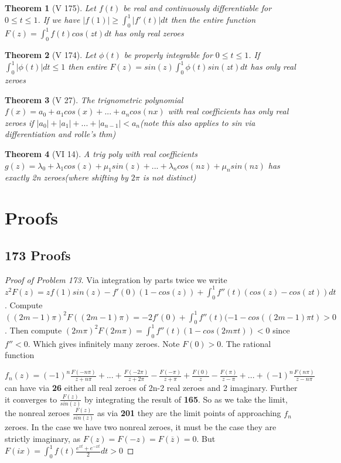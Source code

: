 \documentclass[10pt]{article}
\newcommand{\1}{\textbf{1}}
\newtheorem{theorem}{Theorem}
\theoremstyle{remark}
\theoremstyle{definition}
\begin{document}
\begin{theorem}[V 175] \label{175}
	Let $f(t)$ be real and continuously differentiable for $0 \leq t \leq 1$. If we have $|f(1)| \geq \int_0^1 |f'(t)| dt$ then the entire function $F(z) = \int_0^1 f(t)cos(zt)dt$ has only real zeroes
\end{theorem}

\begin{theorem}[V 174]
	Let $\phi(t)$ be properly integrable for $0 \leq t \leq 1$. If $\int_0^1 |\phi(t)| dt \leq 1$ then entire $F(z)=sin(z) \int_0^1 \phi(t) sin(zt)dt$ has only real zeroes
\end{theorem}

\begin{theorem}[V 27]
	The trignometric polynomial $f(x) = a_0 + a_1 cos(x) + ... + a_ncos(nx)$ with real coefficients has only real zeroes if $|a_0| + |a_1| + ... + |a_{n-1}| < a_n$(note this also applies to sin via differentiation and rolle's thm)
\end{theorem}

\begin{theorem}[VI 14]
	A trig poly with real coefficients $g(z) = \lambda_0 + \lambda_1 cos(z) +\mu_1sin(z) + ... + \lambda_n cos(nz)+\mu_n sin(nz)$ has exactly 2n zeroes(where shifting by $2\pi$ is not distinct)
\end{theorem}




\section{Proofs}


\subsection{173 Proofs}

\begin{proof}[Proof of Problem 173]
	Via integration by parts twice we write $z^2 F(z) = zf(1)sin(z) - f'(0)(1-cos(z)) + \int_0^1 f''(t)(cos(z)-cos(zt))dt$. Compute $((2m-1)\pi)^2F((2m-1)\pi) = -2f'(0)+\int_0^1f''(t)(-1-cos((2m-1)\pi t) > 0$. Then compute $(2m \pi)^2F(2m\pi) = \int_0^1f''(t)(1-cos(2m\pi t)) < 0$ since $f'' < 0$. Which gives infinitely many zeroes. Note $F(0)>0$. The rational function

	$f_n(z) = (-1)^n\frac{F(-n\pi)}{z+n\pi} + ... + \frac{F(-2\pi)}{z+2\pi}-\frac{F(-\pi)}{z+\pi}+\frac{F(0)}{z}-\frac{F(\pi)}{z-\pi}+...+(-1)^n\frac{F(n\pi)}{z-n\pi}$ can have via \textbf{26} either all real zeroes of 2n-2 real zeroes and 2 imaginary. Further it converges to $\frac{F(z)}{sin(z)}$ by integrating the result of \textbf{165}. So as we take the limit, the nonreal zeroes $\frac{F(z)}{sin(z)}$ as via \textbf{201} they are the limit points of approaching $f_n$ zeroes. In the case we have two nonreal zeroes, it must be the case they are strictly imaginary, as $F(z) = F(-z) =F(\overline{z})= 0$. But $F(ix) = \int_0^1 f(t)\frac{e^{xt}+e^{-xt}}{2}dt > 0$
\end{proof}
\end{document}
